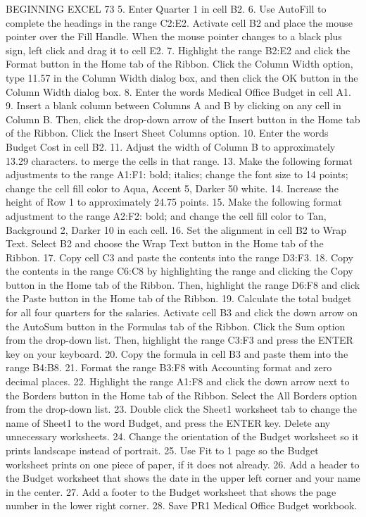 BEGINNING EXCEL 73
5. Enter Quarter 1 in cell B2.
6. Use AutoFill to complete the headings in the range C2:E2. Activate cell B2 and place the mouse
pointer over the Fill Handle. When the mouse pointer changes to a black plus sign, left click and
drag it to cell E2.
7. Highlight the range B2:E2 and click the Format button in the Home tab of the Ribbon. Click the
Column Width option, type 11.57 in the Column Width dialog box, and then click the OK
button in the Column Width dialog box.
8. Enter the words Medical Office Budget in cell A1.
9. Insert a blank column between Columns A and B by clicking on any cell in Column B. Then,
click the drop-down arrow of the Insert button in the Home tab of the Ribbon. Click the Insert
Sheet Columns option.
10. Enter the words Budget Cost in cell B2.
11. Adjust the width of Column B to approximately 13.29 characters.
to merge the cells in that range.
13. Make the following format adjustments to the range A1:F1: bold; italics; change the font size to
14 points; change the cell fill color to Aqua, Accent 5, Darker 50%
white.
14. Increase the height of Row 1 to approximately 24.75 points.
15. Make the following format adjustment to the range A2:F2: bold; and change the cell fill color to
Tan, Background 2, Darker 10%
in each cell.
16. Set the alignment in cell B2 to Wrap Text. Select B2 and choose the Wrap Text button in the
Home tab of the Ribbon.
17. Copy cell C3 and paste the contents into the range D3:F3.
18. Copy the contents in the range C6:C8 by highlighting the range and clicking the Copy button in
the Home tab of the Ribbon. Then, highlight the range D6:F8 and click the Paste button in the
Home tab of the Ribbon.
19. Calculate the total budget for all four quarters for the salaries. Activate cell B3 and click the
down arrow on the AutoSum button in the Formulas tab of the Ribbon. Click the Sum option
from the drop-down list. Then, highlight the range C3:F3 and press the ENTER key on your
keyboard.
20. Copy the formula in cell B3 and paste them into the range B4:B8.
21. Format the range B3:F8 with Accounting format and zero decimal places.
22. Highlight the range A1:F8 and click the down arrow next to the Borders button in the Home tab
of the Ribbon. Select the All Borders option from the drop-down list.
23. Double click the Sheet1 worksheet tab to change the name of Sheet1 to the word Budget, and
press the ENTER key. Delete any unnecessary worksheets.
24. Change the orientation of the Budget worksheet so it prints landscape instead of portrait.
25. Use Fit to 1 page so the Budget worksheet prints on one piece of paper, if it does not already.
26. Add a header to the Budget worksheet that shows the date in the upper left corner and your
name in the center.
27. Add a footer to the Budget worksheet that shows the page number in the lower right corner.
28. Save PR1 Medical Office Budget workbook.

